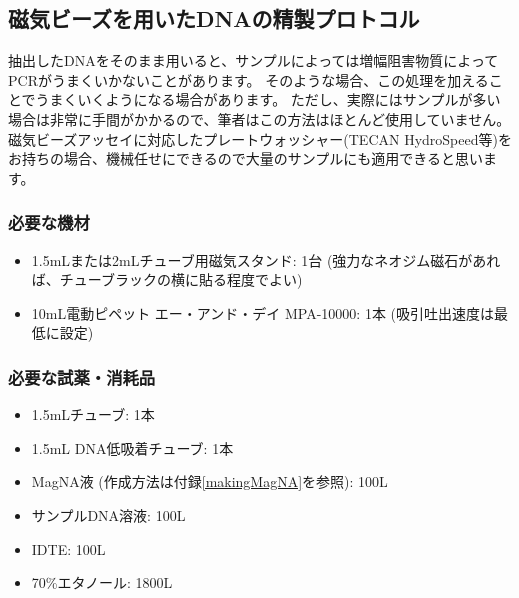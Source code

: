 \documentclass[titlepage,10pt,a4paper,uplatex]{jsbook}
\begin{document}
\subsection{磁気ビーズを用いたDNAの精製プロトコル}\label{PCRinhibitorremoval}

抽出したDNAをそのまま用いると、サンプルによっては増幅阻害物質によってPCRがうまくいかないことがあります。
そのような場合、この処理を加えることでうまくいくようになる場合があります。
ただし、実際にはサンプルが多い場合は非常に手間がかかるので、筆者はこの方法はほとんど使用していません。
磁気ビーズアッセイに対応したプレートウォッシャー(TECAN HydroSpeed等)をお持ちの場合、機械任せにできるので大量のサンプルにも適用できると思います。

\subsubsection{必要な機材}
\begin{itemize}
\item 1.5mLまたは2mLチューブ用磁気スタンド: 1台 (強力なネオジム磁石があれば、チューブラックの横に貼る程度でよい)
\item 10mL電動ピペット エー・アンド・デイ MPA-10000: 1本 (吸引吐出速度は最低に設定)
\end{itemize}

\subsubsection{必要な試薬・消耗品}
\begin{itemize}
\item 1.5mLチューブ: 1本
\item 1.5mL DNA低吸着チューブ: 1本
\item MagNA液 (作成方法は付録\ref{makingMagNA}を参照): 100{\textmu}L
\item サンプルDNA溶液: 100{\textmu}L
\item IDTE: 100{\textmu}L
\item 70\%エタノール: 1800{\textmu}L
\end{itemize}
\end{document}
